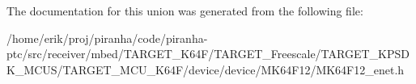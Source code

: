 The documentation for this union was generated from the following file\+:\begin{DoxyCompactItemize}
\item 
/home/erik/proj/piranha/code/piranha-\/ptc/src/receiver/mbed/\+T\+A\+R\+G\+E\+T\+\_\+\+K64\+F/\+T\+A\+R\+G\+E\+T\+\_\+\+Freescale/\+T\+A\+R\+G\+E\+T\+\_\+\+K\+P\+S\+D\+K\+\_\+\+M\+C\+U\+S/\+T\+A\+R\+G\+E\+T\+\_\+\+M\+C\+U\+\_\+\+K64\+F/device/device/\+M\+K64\+F12/M\+K64\+F12\+\_\+enet.\+h\end{DoxyCompactItemize}
